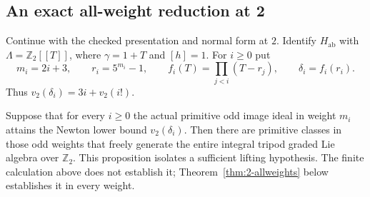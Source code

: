 \subsection{An exact all-weight reduction at 2}

Continue with the checked presentation and normal form at $2$.
Identify $H_{\mathrm{ab}}$ with
$\Lambda=\mathbb Z_2[[T]]$, where $\gamma=1+T$ and $[h]=1$.
For $i\geq0$ put
\[
 m_i=2i+3,\qquad r_i=5^{m_i}-1,\qquad
 f_i(T)=\prod_{j<i}(T-r_j),\qquad \delta_i=f_i(r_i).
\]
Thus $v_2(\delta_i)=3i+v_2(i!)$.

\begin{proposition}\label{prop:newton-basis}
Suppose that for every $i\geq0$ the actual primitive odd
image ideal in weight $m_i$ attains the Newton lower bound
$v_2(\delta_i)$. Then there are primitive classes in those odd
weights that freely generate the entire integral tripod graded
Lie algebra over $\mathbb Z_2$.
This proposition isolates a sufficient lifting hypothesis. The finite
calculation above does not establish it; Theorem~\ref{thm:2-allweights}
below establishes it in every weight.
\end{proposition}

